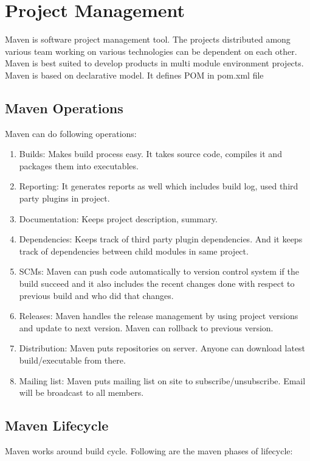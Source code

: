 \documentclass[a4paper,oneside,1,english1pt]{report}
\begin{document}
	\section{Project Management}
		\par Maven is software project management tool. The projects distributed  among various team working on various technologies can be dependent on each other. Maven is best suited to develop products in multi module environment projects.
		Maven is based on declarative model. It defines  \ac{POM} in pom.xml file\\
		\subsection{Maven Operations}
		\par  Maven can do following operations:
		\begin{enumerate}
			\item Builds: Makes build process easy. It takes source code, compiles it and packages them into executables.
			\item Reporting: It generates reports as well which includes build log, used third party plugins in project.
			\item Documentation: Keeps project description, summary.
			\item Dependencies: Keeps track of third party plugin dependencies. And it keeps track of dependencies between child modules in same project.
			\item \ac{SCM}s: Maven can push code automatically  to version control system if the build succeed and it also includes the recent changes done with respect to previous build and who did that changes.
			\item Releases: Maven handles the release management by using project versions and update to next version. Maven can rollback to previous version.
			\item Distribution: Maven puts repositories on server. Anyone can download latest build/executable from there.
			\item Mailing list: Maven puts mailing list on site to subscribe/unsubscribe. Email will be broadcast to all members.
		\end{enumerate}
	\subsection{Maven Lifecycle}
	\par Maven works around build cycle. Following are the maven phases of lifecycle:
\end{document}

